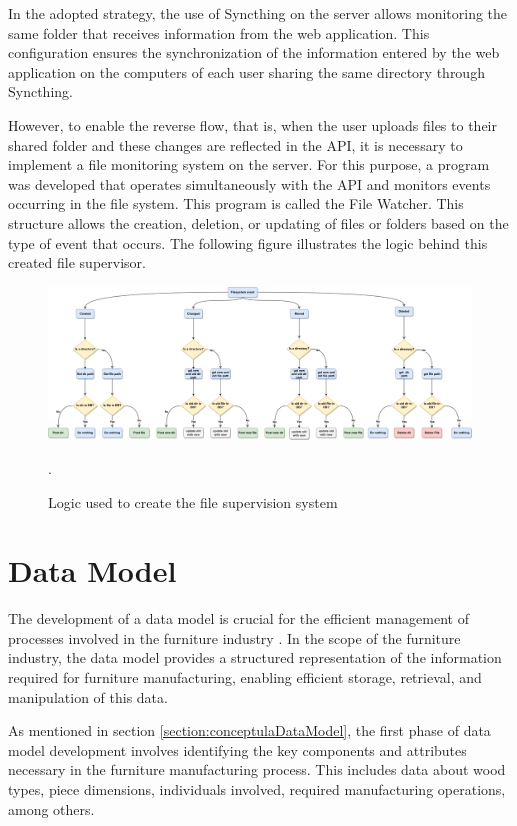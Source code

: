 In the adopted strategy, the use of Syncthing on the server allows monitoring the same folder that receives information from the web application. This configuration ensures the synchronization of the information entered by the web application on the computers of each user sharing the same directory through Syncthing.

However, to enable the reverse flow, that is, when the user uploads files to their shared folder and these changes are reflected in the API, it is necessary to implement a file monitoring system on the server. For this purpose, a program was developed that operates simultaneously with the API and monitors events occurring in the file system. This program is called the File Watcher. This structure allows the creation, deletion, or updating of files or folders based on the type of event that occurs. The following figure illustrates the logic behind this created file supervisor.

\begin{figure}[ht!]
    \centering
    \includegraphics[width=.95\linewidth]{images/Development/chap4/FileWatcher.pdf} 
    \caption{Logic used to create the file supervision system}.
    \label{fig: fileWatcher}
\end{figure}

\section{Data Model}\label{section:dataModel}

The development of a data model is crucial for the efficient management of processes involved in the furniture industry \cite{Batra1995}. In the scope of the furniture industry, the data model provides a structured representation of the information required for furniture manufacturing, enabling efficient storage, retrieval, and manipulation of this data.

As mentioned in section \ref{section:conceptulaDataModel}, the first phase of data model development involves identifying the key components and attributes necessary in the furniture manufacturing process. This includes data about wood types, piece dimensions, individuals involved, required manufacturing operations, among others.

